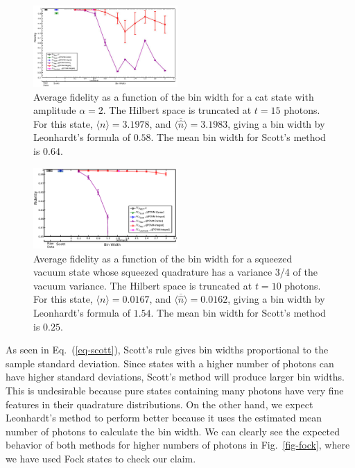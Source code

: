 \documentclass[
reprint,
superscriptaddress,
showpacs,
amsmath,
amssymb,
aps,
pra,
longbibliography
]{revtex4-1}
\begin{document}
\begin{figure}
  \includegraphics[width=0.49\textwidth]{catstate-alpha=2-15photons.eps}
  \caption{Average fidelity as a function of the bin width for a cat
    state with amplitude $\alpha = 2$. The Hilbert space is truncated
    at $t=15$ photons. For this state, $\langle n \rangle = 3.1978$, and 
    $\overline{\langle \hat{n} \rangle}=3.1983$, giving a bin width by
    Leonhardt's formula of $0.58$.  The mean bin width for Scott's
    method is $0.64$.}
  \label{fig-Fid_vs_binwidth_catstate_alpha_2_Mph_15}
\end{figure}

\begin{figure}
  \includegraphics[width=0.49\textwidth]{squeezedvacuum-10photons-var=075.eps}
  \caption{Average fidelity as a function of the bin width for a
    squeezed vacuum state whose squeezed quadrature has a variance 3/4
    of the vacuum variance. The Hilbert space is truncated at $t=10$
    photons. For this state, $\langle n \rangle = 0.0167$, and
    $\overline{\langle \hat{n} \rangle}=0.0162$, giving a bin width by
    Leonhardt's formula of $1.54$.  The mean bin width for Scott's
    method is $0.25$.}
  \label{fig-squeezed_vacuum_variance_075_Mph_10}
\end{figure}

As seen in Eq.~(\ref{eq-scott}), Scott's rule gives bin widths
proportional to the sample standard deviation. Since states with a
higher number of photons can have higher standard deviations,
Scott's method will produce larger bin widths. This is
undesirable because pure states containing many photons have very
fine features in their quadrature distributions. On the other
hand, we expect Leonhardt's method to perform better
because it uses the estimated mean number of photons
to calculate the bin width. We can clearly see the expected behavior
of both methods for higher numbers of photons in Fig.~\ref{fig-fock},
where we have used Fock states to check our claim.
\end{document}
